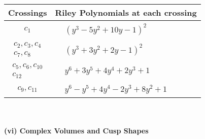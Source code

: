\documentclass[1p]{elsarticle_modified}
\theoremstyle{definition}
\begin{document}
\begin{tabular}{m{50pt}|m{274pt}}
Crossings & \hspace{64pt}Riley Polynomials at each crossing \\
\hline $$\begin{aligned}c_{1}\end{aligned}$$&$\begin{aligned}
&(y^3-5 y^2+10 y-1)^2
\end{aligned}$\\
\hline $$\begin{aligned}c_{2},c_{3},c_{4}\\c_{7},c_{8}\end{aligned}$$&$\begin{aligned}
&(y^3+3 y^2+2 y-1)^2
\end{aligned}$\\
\hline $$\begin{aligned}c_{5},c_{6},c_{10}\\c_{12}\end{aligned}$$&$\begin{aligned}
&y^6+3 y^5+4 y^4+2 y^3+1
\end{aligned}$\\
\hline $$\begin{aligned}c_{9},c_{11}\end{aligned}$$&$\begin{aligned}
&y^6- y^5+4 y^4-2 y^3+8 y^2+1
\end{aligned}$\\
\hline
\end{tabular}\\~\\
\newpage\flushleft \textbf{(vi) Complex Volumes and Cusp Shapes}
\end{document}
